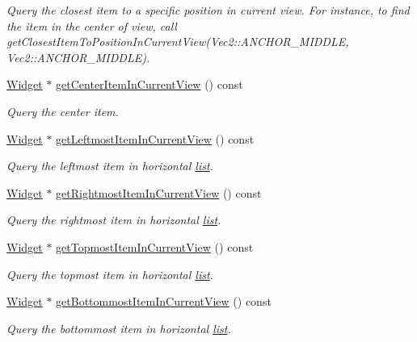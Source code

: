 \begin{DoxyCompactItemize}
\begin{DoxyCompactList}\small\item\em Query the closest item to a specific position in current view. For instance, to find the item in the center of view, call \textquotesingle{}get\+Closest\+Item\+To\+Position\+In\+Current\+View(\+Vec2\+::\+A\+N\+C\+H\+O\+R\+\_\+\+M\+I\+D\+D\+L\+E, Vec2\+::\+A\+N\+C\+H\+O\+R\+\_\+\+M\+I\+D\+D\+L\+E)\textquotesingle{}. \end{DoxyCompactList}\item 
\hyperlink{classui_1_1Widget}{Widget} $\ast$ \hyperlink{classui_1_1ListView_a7647c121e0fd17ad5cac0f6a76f9791b}{get\+Center\+Item\+In\+Current\+View} () const
\begin{DoxyCompactList}\small\item\em Query the center item. \end{DoxyCompactList}\item 
\hyperlink{classui_1_1Widget}{Widget} $\ast$ \hyperlink{classui_1_1ListView_a734534e1c90d258a63dfa3199c2603a4}{get\+Leftmost\+Item\+In\+Current\+View} () const
\begin{DoxyCompactList}\small\item\em Query the leftmost item in horizontal \hyperlink{protocollist-p}{list}. \end{DoxyCompactList}\item 
\hyperlink{classui_1_1Widget}{Widget} $\ast$ \hyperlink{classui_1_1ListView_abb5fcb39d6937a6840e6ea39c91978d5}{get\+Rightmost\+Item\+In\+Current\+View} () const
\begin{DoxyCompactList}\small\item\em Query the rightmost item in horizontal \hyperlink{protocollist-p}{list}. \end{DoxyCompactList}\item 
\hyperlink{classui_1_1Widget}{Widget} $\ast$ \hyperlink{classui_1_1ListView_a301ef416364411d2f6e85f8a13dcda90}{get\+Topmost\+Item\+In\+Current\+View} () const
\begin{DoxyCompactList}\small\item\em Query the topmost item in horizontal \hyperlink{protocollist-p}{list}. \end{DoxyCompactList}\item 
\hyperlink{classui_1_1Widget}{Widget} $\ast$ \hyperlink{classui_1_1ListView_af4d954d5d1e8cb870c3026ddbd131d44}{get\+Bottommost\+Item\+In\+Current\+View} () const
\begin{DoxyCompactList}\small\item\em Query the bottommost item in horizontal \hyperlink{protocollist-p}{list}. \end{DoxyCompactList}\item 

\end{DoxyCompactItemize}
